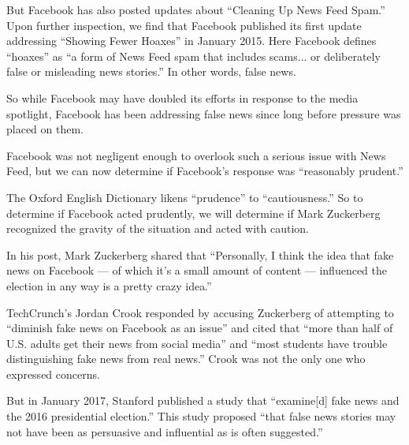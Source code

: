 \par But Facebook has also posted updates about ``Cleaning Up News Feed Spam.'' \cite{fb_newsroom} Upon further inspection, we find that Facebook published its first update addressing ``Showing Fewer Hoaxes'' in January 2015. \cite{fb_hoaxes_2015} Here Facebook defines ``hoaxes'' as ``a form of News Feed spam that includes scams... or deliberately false or misleading news stories.'' \cite{fb_hoaxes_2015} In other words, false news.

\par So while Facebook may have doubled its efforts in response to the media spotlight, \cite{guardian_steps} Facebook has been addressing false news since long before pressure was placed on them.

\par Facebook was not negligent enough to overlook such a serious issue with News Feed, but we can now determine if Facebook's response was ``reasonably prudent.''


\par The Oxford English Dictionary likens ``prudence'' to ``cautiousness.'' \cite{oxford} So to determine if Facebook acted prudently, we will determine if Mark Zuckerberg recognized the gravity of the situation and acted with caution.

\par In his post, Mark Zuckerberg shared that ``Personally, I think the idea that fake news on Facebook — of which it's a small amount of content — influenced the election in any way is a pretty crazy idea.'' \cite{zuck_resp_a}

\par TechCrunch's Jordan Crook responded by accusing Zuckerberg of attempting to ``diminish fake news on Facebook as an issue'' \cite{tc_responsibility} and cited that ``more than half of U.S. adults get their news from social media'' \cite{tc_responsibility} and ``most students have trouble distinguishing fake news from real news.'' \cite{tc_responsibility} Crook was not the only one who expressed concerns. \cite{wp_russia}

\par But in January 2017, Stanford published a study that ``examine[d] fake news and the 2016 presidential election.'' \cite{stanford_election} This study proposed ``that false news stories may not have been as persuasive and influential as is often suggested.'' \cite{stanford_election}

